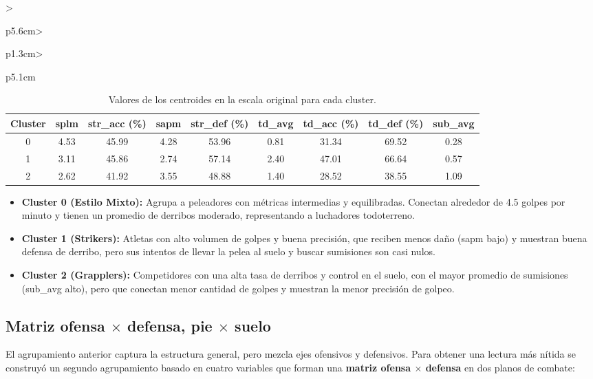 \documentclass[11pt,a4paper]{article}
\begin{document}
\begin{longtable}{>{\raggedright\arraybackslash}p{5.6cm}>{\raggedright\arraybackslash}p{1.3cm}>{\raggedright\arraybackslash}p{5.1cm}}
\begin{table}[H]
    \centering
    \footnotesize
    \setlength{\tabcolsep}{3.5pt}
    \begin{tabular}{ccccccccc}
        \toprule
        \textbf{Cluster} & \textbf{splm} & \textbf{str\_acc (\%)} & \textbf{sapm} & \textbf{str\_def (\%)} & \textbf{td\_avg} & \textbf{td\_acc (\%)} & \textbf{td\_def (\%)} & \textbf{sub\_avg} \\
        \midrule
        0 & 4.53 & 45.99 & 4.28 & 53.96 & 0.81 & 31.34 & 69.52 & 0.28 \\
        1 & 3.11 & 45.86 & 2.74 & 57.14 & 2.40 & 47.01 & 66.64 & 0.57 \\
        2 & 2.62 & 41.92 & 3.55 & 48.88 & 1.40 & 28.52 & 38.55 & 1.09 \\
        \bottomrule
    \end{tabular}
    \caption{Valores de los centroides en la escala original para cada cluster.}
    \label{tab:centroides}
\end{table}

\begin{itemize}
    \item \textbf{Cluster 0 (Estilo Mixto):} Agrupa a peleadores con métricas intermedias y equilibradas. Conectan alrededor de 4.5 golpes por minuto y tienen un promedio de derribos moderado, representando a luchadores todoterreno.
    \item \textbf{Cluster 1 (Strikers):} Atletas con alto volumen de golpes y buena precisión, que reciben menos daño (sapm bajo) y muestran buena defensa de derribo, pero sus intentos de llevar la pelea al suelo y buscar sumisiones son casi nulos.
    \item \textbf{Cluster 2 (Grapplers):} Competidores con una alta tasa de derribos y control en el suelo, con el mayor promedio de sumisiones (sub\_avg alto), pero que conectan menor cantidad de golpes y muestran la menor precisión de golpeo.
\end{itemize}

\subsection{Matriz ofensa $\times$ defensa, pie $\times$ suelo}
\label{subsec:cluster-ofensa-defensa}

El agrupamiento anterior captura la estructura general, pero mezcla ejes ofensivos y defensivos. Para obtener una lectura más nítida se construyó un segundo agrupamiento basado en cuatro variables que forman una \textbf{matriz ofensa $\times$ defensa} en dos planos de combate:


\end{longtable}
\end{document}
